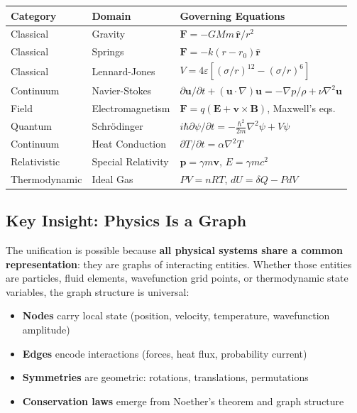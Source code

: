 \documentclass[11pt,a4paper]{article}
\begin{document}
\begin{center}
\begin{tabular}{lll}
\toprule
\textbf{Category} & \textbf{Domain} & \textbf{Governing Equations} \\
\midrule
Classical & Gravity & $\mathbf{F} = -GMm\,\hat{\mathbf{r}}/r^2$ \\
Classical & Springs & $\mathbf{F} = -k(r - r_0)\hat{\mathbf{r}}$ \\
Classical & Lennard-Jones & $V = 4\varepsilon[(\sigma/r)^{12} - (\sigma/r)^6]$ \\
Continuum & Navier-Stokes & $\partial\mathbf{u}/\partial t + (\mathbf{u}\cdot\nabla)\mathbf{u} = -\nabla p/\rho + \nu\nabla^2\mathbf{u}$ \\
Field & Electromagnetism & $\mathbf{F} = q(\mathbf{E} + \mathbf{v}\times\mathbf{B})$, Maxwell's eqs. \\
Quantum & Schr\"{o}dinger & $i\hbar\partial\psi/\partial t = -\frac{\hbar^2}{2m}\nabla^2\psi + V\psi$ \\
Continuum & Heat Conduction & $\partial T/\partial t = \alpha\nabla^2 T$ \\
Relativistic & Special Relativity & $\mathbf{p} = \gamma m\mathbf{v}$, $E = \gamma mc^2$ \\
Thermodynamic & Ideal Gas & $PV = nRT$, $dU = \delta Q - PdV$ \\
\bottomrule
\end{tabular}
\end{center}

\subsection{Key Insight: Physics Is a Graph}

The unification is possible because \textbf{all physical systems share a common representation}: they are graphs of interacting entities. Whether those entities are particles, fluid elements, wavefunction grid points, or thermodynamic state variables, the graph structure is universal:
\begin{itemize}[leftmargin=*]
    \item \textbf{Nodes} carry local state (position, velocity, temperature, wavefunction amplitude)
    \item \textbf{Edges} encode interactions (forces, heat flux, probability current)
    \item \textbf{Symmetries} are geometric: rotations, translations, permutations
    \item \textbf{Conservation laws} emerge from Noether's theorem and graph structure
\end{itemize}
\end{document}
